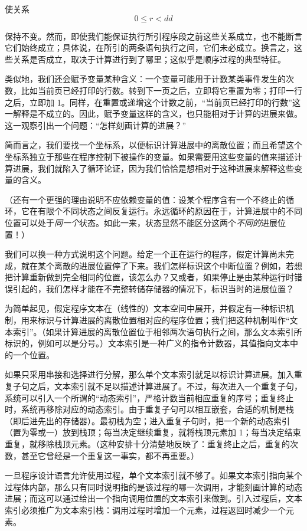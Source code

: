 \noindent
使关系
$$
0 \leqslant r < dd
$$

\noindent
保持不变。然而，即使我们能保证执行所引程序段之前这些关系成立，也不能断言它们始终成立；具体说，在所引的两条语句执行之间，它们未必成立。换言之，这些关系是否成立，取决于计算进行到了哪里；这似乎是顺序过程的典型特征。

类似地，我们还会赋予变量某种含义：一个变量可能用于计数某类事件发生的次数，比如当前页已经打印的行数。转到下一页之后，立即将它重置为零；打印一行之后，立即加 1。同样，在重置或递增这个计数之前，“当前页已经打印的行数”这一解释是不成立的。因此，赋予变量这样的含义，也只能相对于计算的进展来做。这一观察引出一个问题：“怎样刻画计算的进展？”

简而言之，我们要找一个坐标系，以便标识计算进展中的离散位置；而且希望这个坐标系独立于那些在程序控制下被操作的变量。如果需要用这些变量的值来描述计算进展，我们就陷入了循环论证，因为我们恰恰是想相对于这种进展来解释这些变量的含义。

（还有一个更强的理由说明不应依赖变量的值：设某个程序含有一个不终止的循环，它在有限个不同状态之间反复运行。永远循环的原因在于，计算进展中的不同位置可以处于\textit{同一个}状态。如此一来，状态显然不能区分这两个\textit{不同的}进展位置！）

我们可以换一种方式说明这个问题。给定一个正在运行的程序，假定计算尚未完成，就在某个离散的进展位置停了下来。我们怎样标识这个中断位置？例如，若想把计算重新做到完全相同的位置，该怎么办？又或者，如果停止是由某种运行时错误引起的，我们怎样才能在不完整转储存储器的情况下，标识当时的进展位置？

为简单起见，假定程序文本在（线性的）文本空间中展开，并假定有一种标识机制，用来标识与计算进展的离散位置相对应的程序位置；我们把这种机制叫作“文本索引”。（如果计算进展的离散位置位于相邻两次语句执行之间，那么文本索引所标识的，例如可以是分号。）文本索引是一种广义的指令计数器，其值指向文本中的一个位置。

如果只采用串接和选择进行分解，那么单个文本索引就足以标识计算进展。加入重复子句之后，文本索引就不足以描述计算进展了。不过，每次进入一个重复子句，系统可以引入一个所谓的“动态索引”，严格计数当前相应重复的序号；重复终止时，系统再移除对应的动态索引。由于重复子句可以相互嵌套，合适的机制是栈（即后进先出的存储器）。最初栈为空；进入重复子句时，把一个新的动态索引（置为零或一）放到栈顶；每当决定继续重复，就将栈顶元素加 1；每当决定结束重复，就移除栈顶元素。（这种安排十分清楚地反映了：重复终止之后，重复的次数，甚至它曾经是一个重复这一事实，都不再重要。）

一旦程序设计语言允许使用过程，单个文本索引就不够了。如果文本索引指向某个过程体内部，那么只有同时说明指的是该过程的哪一次调用，才能刻画计算的动态进展；而这可以通过给出一个指向调用位置的文本索引来做到。引入过程后，文本索引必须推广为文本索引栈：调用过程时增加一个元素，过程返回时减少一个元素。

